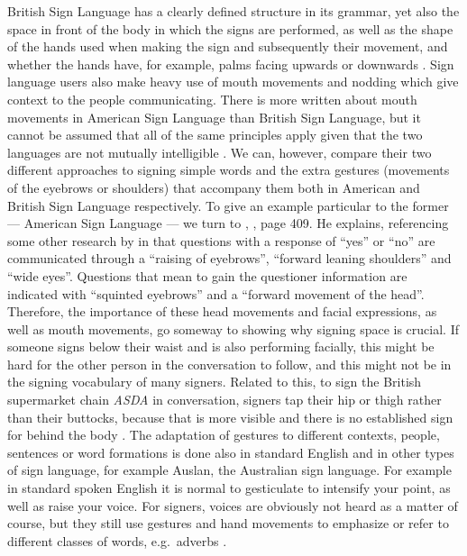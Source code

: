 \documentclass[12pt]{article}
\begin{document}
British Sign Language has a clearly defined structure in its grammar,
yet also the space in front of the body in which the signs are
performed, as well as the shape of the hands used when making the sign
and subsequently their movement, and whether the hands have, for
example, palms facing upwards or downwards \citep[p.\
408]{sociolinguistics-mesthrie}. Sign language users also make
heavy use of mouth movements and nodding \citep[p.\
3]{linguistics-of-bsl} which give context to the people communicating.
There is more written about mouth movements in American Sign Language
than British Sign Language, but it cannot be assumed that all of the
same principles apply given that the two languages are not mutually
intelligible \citep{ucl-sign-language-introduction}. We can, however,
compare their two different approaches to signing simple words and the
extra gestures (movements of the eyebrows or shoulders) that accompany
them both in American and British Sign Language respectively. To give
an example particular to the former --- American Sign Language --- we
turn to \citeauthor{sociolinguistics-mesthrie},
\citeyear{sociolinguistics-mesthrie}, page 409. He explains,
referencing some other research by \citeauthor{asl-facial-signals} in
\citeyear{asl-facial-signals} that questions with a response of
``yes'' or ``no'' are communicated through a ``raising of eyebrows'',
``forward leaning shoulders'' and ``wide eyes''. Questions that mean
to gain the questioner information are indicated with ``squinted
eyebrows'' and a ``forward movement of the head''. Therefore, the
importance of these head movements and facial expressions, as well as
mouth movements, go someway to showing why signing space is crucial.
If someone signs below their waist and is also performing facially,
this might be hard for the other person in the conversation to follow,
and this might not be in the signing vocabulary of many signers.
Related to this, to sign the British supermarket chain \textit{ASDA}
in conversation, signers tap their hip or thigh rather than their
buttocks, because that is more visible and there is no established
sign for behind the body \citep[p.\ 5]{linguistics-of-bsl}. The
adaptation of gestures to different contexts, people, sentences or
word formations is done also in standard English and in other types of
sign language, for example Auslan, the Australian sign language. For
example in standard spoken English it is normal to gesticulate to
intensify your point, as well as raise your voice. For signers, voices
are obviously not heard as a matter of course, but they still use
gestures and hand movements to emphasize or refer to different classes
of words, e.g.\ adverbs \citep[p.\ 86]{linguistics-of-bsl}.\\
\end{document}
